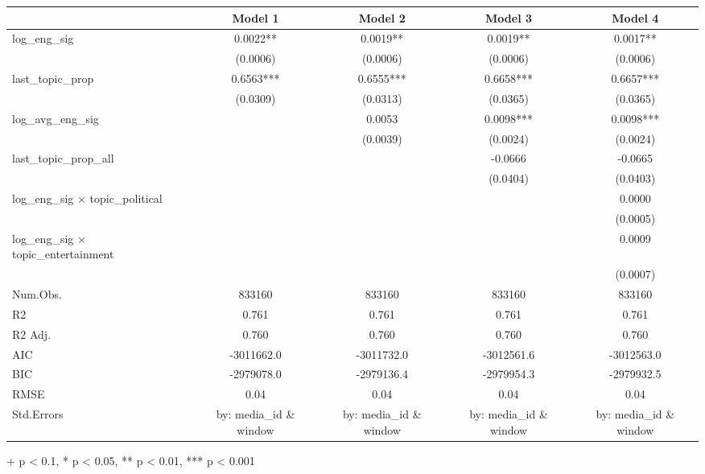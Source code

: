 \setlength{\LTpost}{0mm}
\begin{longtable}{lcccc}
\toprule
  & Model 1 & Model 2 & Model 3 & Model 4 \\ 
\midrule
log\_eng\_sig & 0.0022** & 0.0019** & 0.0019** & 0.0017** \\ 
 & (0.0006) & (0.0006) & (0.0006) & (0.0006) \\ 
last\_topic\_prop & 0.6563*** & 0.6555*** & 0.6658*** & 0.6657*** \\ 
 & (0.0309) & (0.0313) & (0.0365) & (0.0365) \\ 
log\_avg\_eng\_sig &  & 0.0053 & 0.0098*** & 0.0098*** \\ 
 &  & (0.0039) & (0.0024) & (0.0024) \\ 
last\_topic\_prop\_all &  &  & -0.0666 & -0.0665 \\ 
 &  &  & (0.0404) & (0.0403) \\ 
log\_eng\_sig × topic\_political &  &  &  & 0.0000 \\ 
 &  &  &  & (0.0005) \\ 
log\_eng\_sig × topic\_entertainment &  &  &  & 0.0009 \\ 
 &  &  &  & (0.0007) \\ 
Num.Obs. & 833160 & 833160 & 833160 & 833160 \\ 
R2 & 0.761 & 0.761 & 0.761 & 0.761 \\ 
R2 Adj. & 0.760 & 0.760 & 0.760 & 0.760 \\ 
AIC & -3011662.0 & -3011732.0 & -3012561.6 & -3012563.0 \\ 
BIC & -2979078.0 & -2979136.4 & -2979954.3 & -2979932.5 \\ 
RMSE & 0.04 & 0.04 & 0.04 & 0.04 \\ 
Std.Errors & by: media\_id \& window & by: media\_id \& window & by: media\_id \& window & by: media\_id \& window \\ 
\bottomrule
\end{longtable}
\begin{minipage}{\linewidth}
+ p < 0.1, * p < 0.05, ** p < 0.01, *** p < 0.001\\
\end{minipage}


